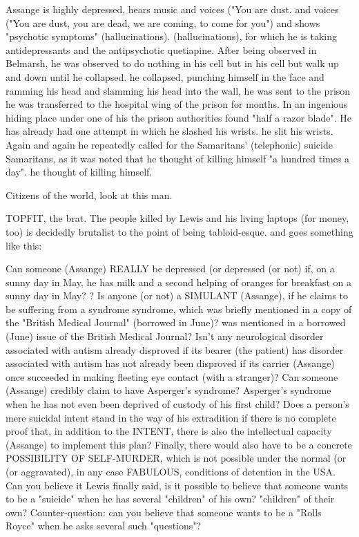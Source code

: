 \begin{multicols}{2}
Assange is highly depressed, hears music and voices ("You are dust.
and voices ("You are dust, you are dead, we are coming,
to come for you") and shows "psychotic symptoms" (hallucinations).
(hallucinations), for which he is taking antidepressants and the
antipsychotic quetiapine. After being observed in
Belmarsh, he was observed to do nothing in his cell but
in his cell but walk up and down until he collapsed.
he collapsed, punching himself in the face and ramming his head
and slamming his head into the wall, he was sent to the prison
he was transferred to the hospital wing of the prison for months. In an ingenious hiding place under one of his
the prison authorities found "half a razor blade". He has already had one attempt in which he slashed his wrists.
he slit his wrists. Again and again
he repeatedly called for the Samaritans' (telephonic) suicide
Samaritans, as it was noted that he thought of killing himself "a hundred times a day".
he thought of killing himself.

Citizens of the world, look at this man.

TOPFIT, the brat. The people killed by Lewis and his living
laptops (for money, too) is decidedly brutalist to the point of being tabloid-esque.
and goes something like this:

Can someone (Assange) REALLY be depressed (or
depressed (or not) if, on a sunny day in May, he has milk
and a second helping of oranges for breakfast on a sunny day in May?
? Is anyone (or not) a SIMULANT (Assange),
if he claims to be suffering from a syndrome
syndrome, which was briefly mentioned in a copy of the "British Medical Journal" (borrowed in June)?
was mentioned in a borrowed (June) issue of the British Medical Journal? Isn't any neurological disorder associated with autism already disproved if its bearer (the patient) has
disorder associated with autism has not already been disproved if its carrier (Assange)
once succeeded in making fleeting eye contact (with a stranger)? Can someone
(Assange) credibly claim to have Asperger's syndrome?
Asperger's syndrome when he has not even been deprived of custody of his first child?
Does a person's mere suicidal intent stand in the way of his
extradition if there is no complete proof that, in addition to the INTENT, there is also the intellectual
capacity (Assange) to implement this plan? Finally, there would also have to be a concrete POSSIBILITY OF SELF-MURDER, which is not possible under the normal (or
(or aggravated), in any case FABULOUS, conditions of detention in the USA. Can you believe it
Lewis finally said, is it possible to believe that someone wants to be a "suicide" when he has several "children" of his own?
"children" of their own? Counter-question: can you believe that someone wants to be a "Rolls Royce" when he asks several such "questions"?



\end{multicols}
